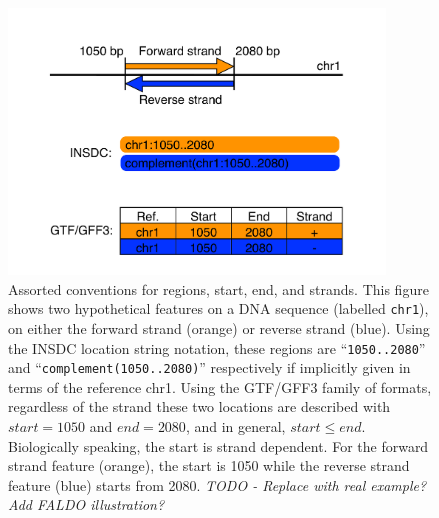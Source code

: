 \begin{figure}[p]
\begin{center}
\includegraphics[width=10cm]{figures/figure-strand.pdf}
\end{center}
\caption{Assorted conventions for regions, start, end, and strands.
This figure shows two hypothetical features on a DNA sequence
(labelled \texttt{chr1}), on either the forward strand (orange) or
reverse strand (blue).
Using the INSDC location string notation, these regions are
``\texttt{1050..2080}'' and ``\texttt{complement(1050..2080)}''
respectively if implicitly given in terms of the reference chr1.
Using the GTF/GFF3 family of formats, regardless of the
strand these two locations are described with $start = 1050$
and $end = 2080$, and in general, $start \leq end$.
Biologically speaking, the start is strand dependent.
For the forward strand feature (orange), the start is 1050
while the reverse strand feature (blue) starts from 2080.
\textit{TODO - Replace with real example? Add FALDO illustration?}
}
\label{fig:strands}
\end{figure}
